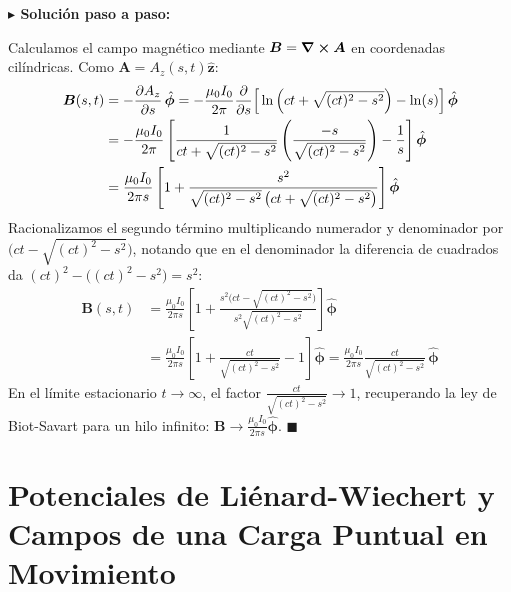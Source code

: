 \documentclass[11pt,a4paper]{book}
\newenvironment{solucion}{%
    \par\medskip\noindent\textbf{\color{blue!65!black}\Large $\blacktriangleright$ Solución paso a paso:}\par\medskip
}{%
    \hfill$\blacksquare$\par\bigskip
}
\newcommand{\phihat}{\hat{\bm{\phi}}}
\newcommand{\zhat}{\hat{\bm{z}}}
\newcommand{\Bvec}{\bm{B}}
\newcommand{\Avec}{\bm{A}}
\begin{document}
\begin{solucion}
Calculamos el campo magnético mediante $\Bvec = \curl{\Avec}$ en coordenadas cilíndricas. Como $\Avec = A_z(s,t)\zhat$:
\begin{align}
    \Bvec(s,t) &= -\pdv{A_z}{s}\,\phihat = -\frac{\mu_0 I_0}{2\pi} \pdv{}{s}\Big[ \ln\left(ct + \sqrt{(ct)^2 - s^2}\right) - \ln(s) \Big]\,\phihat \nonumber \\
    &= -\frac{\mu_0 I_0}{2\pi} \left[ \frac{1}{ct + \sqrt{(ct)^2 - s^2}}\left(\frac{-s}{\sqrt{(ct)^2 - s^2}}\right) - \frac{1}{s} \right] \phihat \nonumber \\
    &= \frac{\mu_0 I_0}{2\pi s} \left[ 1 + \frac{s^2}{\sqrt{(ct)^2 - s^2}\,\big(ct + \sqrt{(ct)^2 - s^2}\big)} \right] \phihat
\end{align}
Racionalizamos el segundo término multiplicando numerador y denominador por $\big(ct - \sqrt{(ct)^2 - s^2}\big)$, notando que en el denominador la diferencia de cuadrados da $(ct)^2 - \big((ct)^2 - s^2\big) = s^2$:
\begin{align}
    \Bvec(s,t) &= \frac{\mu_0 I_0}{2\pi s} \left[ 1 + \frac{s^2\big(ct - \sqrt{(ct)^2 - s^2}\big)}{s^2 \sqrt{(ct)^2 - s^2}} \right] \phihat \nonumber \\
    &= \frac{\mu_0 I_0}{2\pi s} \left[ 1 + \frac{ct}{\sqrt{(ct)^2 - s^2}} - 1 \right] \phihat = \frac{\mu_0 I_0}{2\pi s} \frac{ct}{\sqrt{(ct)^2 - s^2}}\,\phihat
\end{align}
En el límite estacionario $t \to \infty$, el factor $\frac{ct}{\sqrt{(ct)^2 - s^2}} \to 1$, recuperando la ley de Biot-Savart para un hilo infinito: $\Bvec \to \frac{\mu_0 I_0}{2\pi s}\phihat$.
\end{solucion}

\section[Potenciales de Liénard-Wiechert]{Potenciales de Liénard-Wiechert y Campos de una Carga Puntual en Movimiento}
\end{document}

